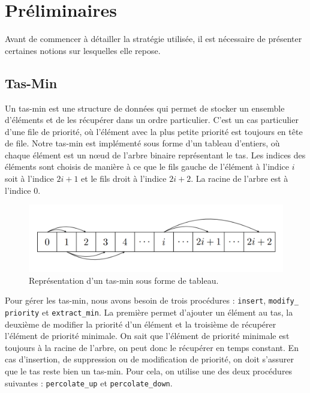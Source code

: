 \chapter{Préliminaires}
\label{cp:preliminaires}

Avant de commencer à détailler la stratégie utilisée, il est nécessaire de présenter certaines notions sur lesquelles elle repose.

\section{Tas-Min}
\label{sec:tas-min}

Un tas-min est une structure de données qui permet de stocker un ensemble d'éléments et de les récupérer dans un ordre particulier. 
C'est un cas particulier d'une file de priorité, où l'élément avec la plus petite priorité est toujours en tête de file.
\newline\newline
Notre tas-min est implémenté sous forme d'un tableau d'entiers, où chaque élément est un nœud de l'arbre binaire représentant le tas.
Les indices des éléments sont choisis de manière à ce que le fils gauche de l'élément à l'indice $i$ soit à l'indice $2i+1$ et le fils droit à l'indice $2i+2$.
La racine de l'arbre est à l'indice 0.

\begin{figure}[!htpb]
    \centering
    \includegraphics[width=\linewidth]{Figures/array.png}
    \caption[Représentation d'un tas-min sous forme de tableau.]{Représentation d'un tas-min sous forme de tableau.}
    \label{fig:array}
\end{figure}

\newpage

Pour gérer les tas-min, nous avons besoin de trois procédures : \texttt{insert}, \texttt{modify\_}
\newline
\texttt{priority} et \texttt{extract\_min}.
La première permet d'ajouter un élément au tas, la deuxième de modifier la priorité d'un élément et la troisième de récupérer l'élément de priorité minimale.
\newline
On sait que l'élément de priorité minimale est toujours à la racine de l'arbre, on peut donc le récupérer en temps constant.
En cas d'insertion, de suppression ou de modification de priorité, on doit s'assurer que le tas reste bien un tas-min.
Pour cela, on utilise une des deux procédures suivantes : \texttt{percolate\_up} et \texttt{percolate\_down}.

